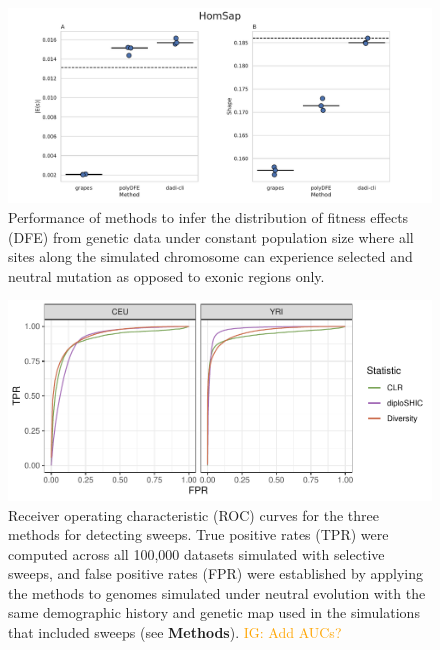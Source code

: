 \documentclass[hidelinks]{article}
\newcommand{\igcomment}[1]{\textcolor{orange}{IG: #1}}
\begin{document}
\begin{figure}[h]
    \centering
    \includegraphics[width=\textwidth]{figures/HomSap/Constant/HomSap_Constant_Gamma_K17_all_sites_DFE_plot}
    \caption{
    \label{fig:homsap-dfe.constant.all_sites}
    Performance of methods to infer the distribution of fitness effects (DFE) from genetic data
    under constant population size  where all sites along the simulated chromosome can experience selected and neutral mutation
    as opposed to exonic regions only.\\
    }
\end{figure}



\begin{figure}
    \centering
    \includegraphics[width=0.8 \textwidth]{figures/sweeps/roc_neutral_null.pdf}
    \caption{
    \label{fig:roc-curves}
    Receiver operating characteristic (ROC) curves for the three methods for detecting sweeps.
    True positive rates (TPR) were computed across all 100,000 datasets simulated with selective sweeps,
    and false positive rates (FPR) were established by applying the methods to genomes simulated
    under neutral evolution with the same demographic history and genetic map
    used in the simulations that included sweeps (see \textbf{Methods}).
    \igcomment{Add AUCs?}
    }
\end{figure}
\end{document}
